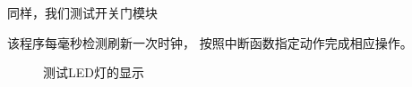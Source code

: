 \documentclass[../main.tex]{subfiles} %
\begin{document}
同样，我们测试开关门模块


该程序每毫秒检测刷新一次时钟，
按照中断函数指定动作完成相应操作。

\begin{figure}[H]
  \centering
  \def\svgwidth{\linewidth}
  
  \caption{测试LED灯的显示}
  \label{fig:door_status}
\end{figure}
\end{document}
